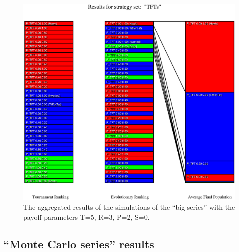 \begin{figure}
\begin{center}
\includegraphics[width=20cm]{tables/TFTs_P2.eps}
\caption{\label{TFTs_P2}The aggregated results of the
simulations of the ``big series'' with the payoff parameters T=5, R=3, P=2,
S=0.}
\end{center}
\end{figure}


\newpage
\subsection{``Monte Carlo series'' results}
\label{MonteCarloResults}



\newpage


